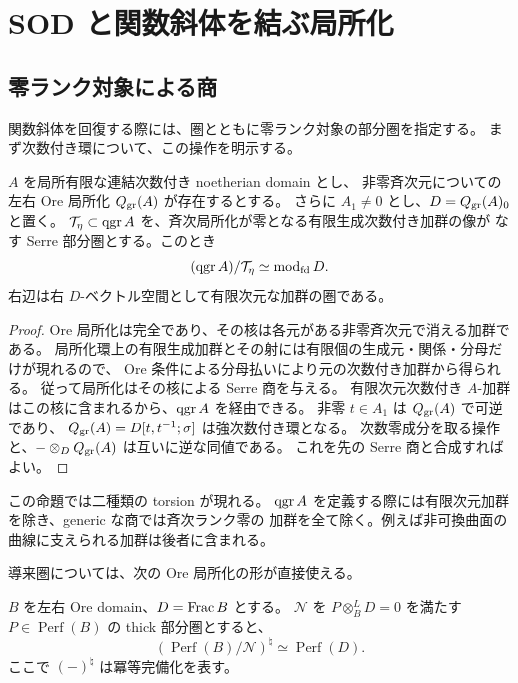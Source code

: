 \section{SOD と関数斜体を結ぶ局所化}
\label{sec:sod-functions}

\subsection{零ランク対象による商}

関数斜体を回復する際には、圏とともに零ランク対象の部分圏を指定する。
まず次数付き環について、この操作を明示する。

\begin{proposition}\label{prop:generic-serre}
$A$ を局所有限な連結次数付き noetherian domain とし、
非零斉次元についての左右 Ore 局所化 $Q_{\rm gr}(A)$ が存在するとする。
さらに $A_1\ne0$ とし、$D=Q_{\rm gr}(A)_0$ と置く。
$\mathcal T_\eta\subset\operatorname{qgr} A$ を、斉次局所化が零となる有限生成次数付き加群の像が
なす Serre 部分圏とする。このとき
\[
 (\operatorname{qgr} A)/\mathcal T_\eta\simeq\operatorname{mod}_{\rm fd}D.
\]
右辺は右 $D$-ベクトル空間として有限次元な加群の圏である。
\end{proposition}

\begin{proof}
Ore 局所化は完全であり、その核は各元がある非零斉次元で消える加群である。
局所化環上の有限生成加群とその射には有限個の生成元・関係・分母だけが現れるので、
Ore 条件による分母払いにより元の次数付き加群から得られる。
従って局所化はその核による Serre 商を与える。
有限次元次数付き $A$-加群はこの核に含まれるから、$\operatorname{qgr} A$ を経由できる。
非零 $t\in A_1$ は $Q_{\rm gr}(A)$ で可逆であり、
$Q_{\rm gr}(A)=D[t,t^{-1};\sigma]$ は強次数付き環となる。
次数零成分を取る操作と、$-\otimes_DQ_{\rm gr}(A)$ は互いに逆な同値である。
これを先の Serre 商と合成すればよい。
\end{proof}

この命題では二種類の torsion が現れる。
$\operatorname{qgr} A$ を定義する際には有限次元加群を除き、generic な商では斉次ランク零の
加群を全て除く。例えば非可換曲面の曲線に支えられる加群は後者に含まれる。

導来圏については、次の Ore 局所化の形が直接使える。

\begin{proposition}\label{prop:generic-perf}
$B$ を左右 Ore domain、$D=\operatorname{Frac} B$ とする。
$\mathcal N$ を $P\otimes_B^LD=0$ を満たす
$P\in\operatorname{Perf}(B)$ の thick 部分圏とすると、
\[
 \left(\operatorname{Perf}(B)/\mathcal N\right)^\natural
 \simeq\operatorname{Perf}(D).
\]
ここで $(-)^\natural$ は冪等完備化を表す。
\end{proposition}

